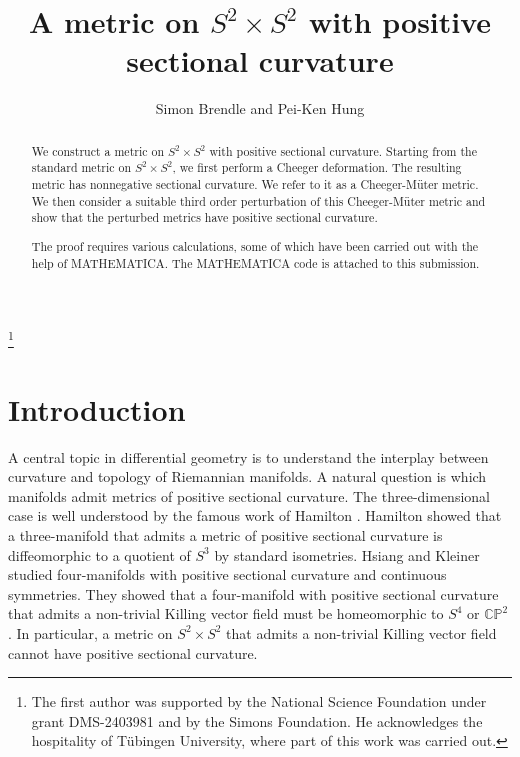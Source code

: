 \documentclass[11pt]{amsart}
\theoremstyle{definition}
\begin{document}
\title{A metric on $S^2 \times S^2$ with positive sectional curvature}
\author{Simon Brendle and Pei-Ken Hung}
\address{Columbia University \\ 2990 Broadway \\ New York NY 10027 \\ USA}
\address{University of Illinois \\ 1409 W. Green Street \\ Urbana IL 61801 \\ USA}
\thanks{The first author was supported by the National Science Foundation under grant DMS-2403981 and by the Simons Foundation. He acknowledges the hospitality of T\"ubingen University, where part of this work was carried out.}
\begin{abstract}
We construct a metric on $S^2 \times S^2$ with positive sectional curvature. Starting from the standard metric on $S^2 \times S^2$, we first perform a Cheeger deformation. The resulting metric has nonnegative sectional curvature. We refer to it as a Cheeger-M\"uter metric. We then consider a suitable third order perturbation of this Cheeger-M\"uter metric and show that the perturbed metrics have positive sectional curvature.

The proof requires various calculations, some of which have been carried out with the help of MATHEMATICA. The MATHEMATICA code is attached to this submission.
\end{abstract}
\maketitle 

\section{Introduction} 

A central topic in differential geometry is to understand the interplay between curvature and topology of Riemannian manifolds. A natural question is which manifolds admit metrics of positive sectional curvature. The three-dimensional case is well understood by the famous work of Hamilton \cite{Hamilton}. Hamilton showed that a three-manifold that admits a metric of positive sectional curvature is diffeomorphic to a quotient of $S^3$ by standard isometries. Hsiang and Kleiner \cite{Hsiang-Kleiner} studied four-manifolds with positive sectional curvature and continuous symmetries. They showed that a four-manifold with positive sectional curvature that admits a non-trivial Killing vector field must be homeomorphic to $S^4$ or $\mathbb{CP}^2$. In particular, a metric on $S^2 \times S^2$ that admits a non-trivial Killing vector field cannot have positive sectional curvature.
\end{document}
